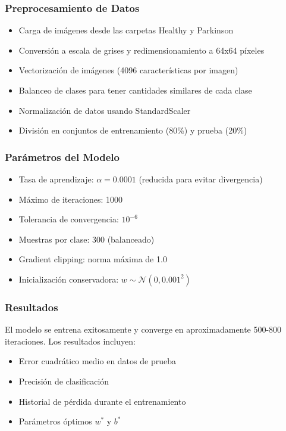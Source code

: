 \documentclass[a4paper,12pt]{article}
\begin{document}
\subsubsection{Preprocesamiento de Datos}
\begin{itemize}
    \item Carga de imágenes desde las carpetas Healthy y Parkinson
    \item Conversión a escala de grises y redimensionamiento a 64x64 píxeles
    \item Vectorización de imágenes (4096 características por imagen)
    \item Balanceo de clases para tener cantidades similares de cada clase
    \item Normalización de datos usando StandardScaler
    \item División en conjuntos de entrenamiento (80\%) y prueba (20\%)
\end{itemize}

\subsubsection{Parámetros del Modelo}
\begin{itemize}
    \item Tasa de aprendizaje: $\alpha = 0.0001$ (reducida para evitar divergencia)
    \item Máximo de iteraciones: 1000
    \item Tolerancia de convergencia: $10^{-6}$
    \item Muestras por clase: 300 (balanceado)
    \item Gradient clipping: norma máxima de 1.0
    \item Inicialización conservadora: $w \sim \mathcal{N}(0, 0.001^2)$
\end{itemize}

\subsubsection{Resultados}
El modelo se entrena exitosamente y converge en aproximadamente 500-800 iteraciones. Los resultados incluyen:
\begin{itemize}
    \item Error cuadrático medio en datos de prueba
    \item Precisión de clasificación
    \item Historial de pérdida durante el entrenamiento
    \item Parámetros óptimos $w^*$ y $b^*$
\end{itemize}
\end{document}
